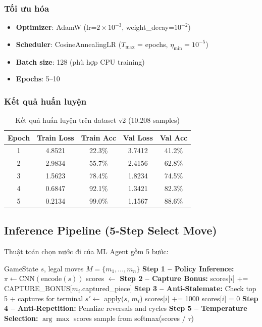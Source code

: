 \subsubsection{Tối ưu hóa}
\begin{itemize}
    \item \textbf{Optimizer}: AdamW (lr=$2 \times 10^{-3}$, weight\_decay=$10^{-2}$)
    \item \textbf{Scheduler}: CosineAnnealingLR ($T_{\max}$ = epochs, $\eta_{\min} = 10^{-5}$)
    \item \textbf{Batch size}: 128 (phù hợp CPU training)
    \item \textbf{Epochs}: 5--10
\end{itemize}

\subsubsection{Kết quả huấn luyện}
\begin{table}[H]
\centering
\caption{Kết quả huấn luyện trên dataset v2 (10.208 samples)}
\begin{tabular}{ccccc}
\toprule
\textbf{Epoch} & \textbf{Train Loss} & \textbf{Train Acc} & \textbf{Val Loss} & \textbf{Val Acc} \\
\midrule
1 & 4.8521 & 22.3\% & 3.7412 & 41.2\% \\
2 & 2.9834 & 55.7\% & 2.4156 & 62.8\% \\
3 & 1.5623 & 78.4\% & 1.8234 & 74.5\% \\
4 & 0.6847 & 92.1\% & 1.3421 & 82.3\% \\
5 & 0.2134 & 99.0\% & 1.1567 & 88.6\% \\
\bottomrule
\end{tabular}
\end{table}

\subsection{Inference Pipeline (5-Step Select Move)}
Thuật toán chọn nước đi của ML Agent gồm 5 bước:

\begin{algorithm}[H]
\caption{ML Agent Select Move Pipeline}
\begin{algorithmic}[1]
\Require GameState $s$, legal moves $M = \{m_1, ..., m_n\}$
\State \textbf{Step 1 -- Policy Inference:} $\pi \leftarrow \text{CNN}(\text{encode}(s))$
\State scores $\leftarrow$ 
\State \textbf{Step 2 -- Capture Bonus:}
    \State scores[$i$] += CAPTURE\_BONUS[$m_i$.captured\_piece]
\EndFor
\State \textbf{Step 3 -- Anti-Stalemate:} Check top 5 + captures for terminal
    \State $s' \leftarrow$ apply($s$, $m_i$)
     scores[$i$] += 1000
     scores[$i$] = 0
    \EndIf
\EndFor
\State \textbf{Step 4 -- Anti-Repetition:} Penalize reversals and cycles
\State \textbf{Step 5 -- Temperature Selection:}
 \Return $\arg\max$ scores
\Else{} \Return sample from softmax(scores / $\tau$)
\EndIf
\end{algorithmic}
\end{algorithm}

